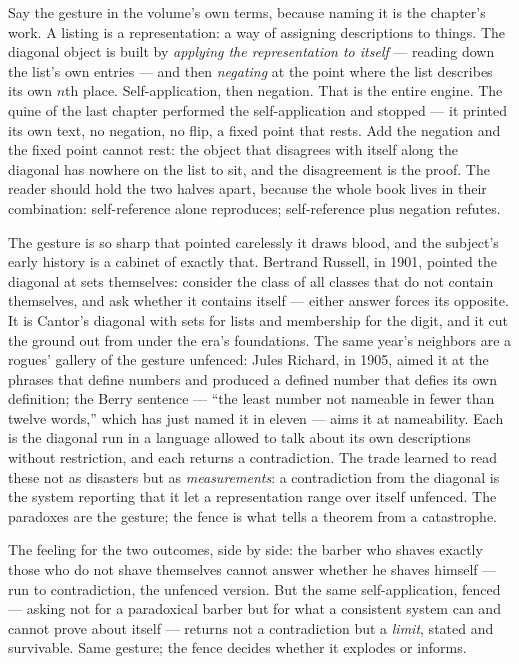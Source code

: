 Say the gesture in the volume's own terms, because naming it is the
chapter's work. A listing is a representation: a way of assigning
descriptions to things. The diagonal object is built by \emph{applying
the representation to itself} --- reading down the list's own entries ---
and then \emph{negating} at the point where the list describes its own
$n$th place. Self-application, then negation. That is the entire engine.
The quine of the last chapter performed the self-application and stopped
--- it printed its own text, no negation, no flip, a fixed point that
rests. Add the negation and the fixed point cannot rest: the object that
disagrees with itself along the diagonal has nowhere on the list to sit,
and the disagreement is the proof. The reader should hold the two halves
apart, because the whole book lives in their combination: self-reference
alone reproduces; self-reference plus negation refutes.

The gesture is so sharp that pointed carelessly it draws blood, and the
subject's early history is a cabinet of exactly that. Bertrand Russell,
in 1901, pointed the diagonal at sets themselves: consider the class of
all classes that do not contain themselves, and ask whether it contains
itself --- either answer forces its opposite. It is Cantor's diagonal
with sets for lists and membership for the digit, and it cut the ground
out from under the era's foundations. The same year's neighbors are a
rogues' gallery of the gesture unfenced: Jules Richard, in 1905, aimed it
at the phrases that define numbers and produced a defined number that
defies its own definition; the Berry sentence --- ``the least number not
nameable in fewer than twelve words,'' which has just named it in eleven
--- aims it at nameability. Each is the diagonal run in a language allowed
to talk about its own descriptions without restriction, and each returns
a contradiction. The trade learned to read these not as disasters but as
\emph{measurements}: a contradiction from the diagonal is the system
reporting that it let a representation range over itself unfenced. The
paradoxes are the gesture; the fence is what tells a theorem from a
catastrophe.

\begin{intuition}
The feeling for the two outcomes, side by side: the barber who shaves
exactly those who do not shave themselves cannot answer whether he shaves
himself --- run to contradiction, the unfenced version. But the same
self-application, fenced --- asking not for a paradoxical barber but for
what a consistent system can and cannot prove about itself --- returns
not a contradiction but a \emph{limit}, stated and survivable. Same
gesture; the fence decides whether it explodes or informs.
\end{intuition}

